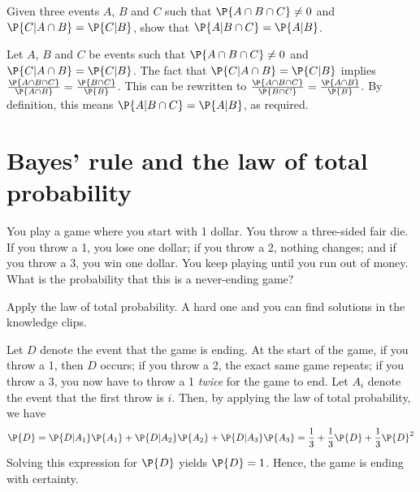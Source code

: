 	\begin{exercise}
		Given three events $A$, $B$ and $C$ such that $\P{A \cap B \cap C} \neq 0$ and $\P{C | A \cap B} = \P{C | B}$, show that $\P{A | B \cap C} = \P{A | B}$.
		\begin{solution}
			Let $A$, $B$ and $C$ be events such that $\P{A \cap B \cap C} \neq 0$ and $\P{C | A \cap B} = \P{C | B}$. The fact that $\P{C | A \cap B} = \P{C | B}$ implies $\frac{\P{A \cap B \cap C}}{\P{A \cap B}} = \frac{\P{B \cap C}}{\P{B}}$. This can be rewritten to $\frac{\P{A \cap B \cap C}}{\P{B \cap C}} = \frac{\P{A \cap B}}{\P{B}}$. By definition, this means $\P{A | B \cap C} = \P{A | B}$, as required.
		\end{solution}
	\end{exercise}

\section{Bayes' rule and the law of total probability}
\label{sec:section-2.3}
	
	\begin{exercise}
		You play a game where you start with 1 dollar. You throw a three-sided fair die. If you throw a 1, you lose one dollar; if you throw a 2, nothing changes; and if you throw a 3, you win one dollar. You keep playing until you run out of money. What is the probability that this is a never-ending game?
		\begin{hint}
			Apply the law of total probability. A hard one and you can find solutions in the knowledge clips.
		\end{hint}
		\begin{solution}
			Let $D$ denote the event that the game is ending. At the start of the game, if you throw a 1, then $D$ occurs; if you throw a 2, the exact same game repeats; if you throw a 3, you now have to throw a 1 \emph{twice} for the game to end. Let $A_i$ denote the event that the first throw is $i$. Then, by applying the law of total probability, we have
			\begin{equation*}
				\P{D} = \P{D | A_1} \P{A_1} + \P{D | A_2} \P{A_2} + \P{D | A_3} \P{A_3} = \frac{1}{3} + \frac{1}{3} \P{D} + \frac{1}{3} \P{D}^2
			\end{equation*}
			Solving this expression for $\P{D}$ yields $\P{D} = 1$. Hence, the game is ending with certainty.
		\end{solution}
	\end{exercise}
	
